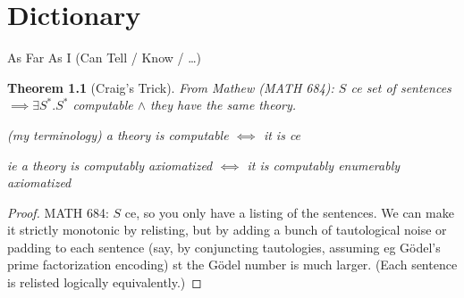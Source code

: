 \documentclass[
	fontsize=10pt, %
	twoside=false, %
	secnumdepth=-1, %
]{kaobook}
\theoremstyle{break}
\newtheorem*{thm}{Theorem} %
\begin{document}
\chapter{Dictionary}
    As Far As I (Can Tell / Know / …)
    \begin{thm}[Craig's Trick]
        From Mathew (MATH 684):
        $S$ ce set of sentences $⟹ ∃S^*.S^*$ computable $∧$ they have the same theory.

        (my terminology) a theory is computable $⟺$ it is ce

        ie a theory is computably axiomatized $⟺$ it is computably enumerably axiomatized
    \end{thm}
    \begin{proof}
        MATH 684:
        $S$ ce, so you only have a listing of the sentences.
        We can make it strictly monotonic by relisting,
        but by adding a bunch of tautological noise or padding to each sentence
        (say, by conjuncting tautologies, assuming eg Gödel's prime factorization encoding)
        st the Gödel number is much larger.
        (Each sentence is relisted logically equivalently.)
    \end{proof}
\end{document}

